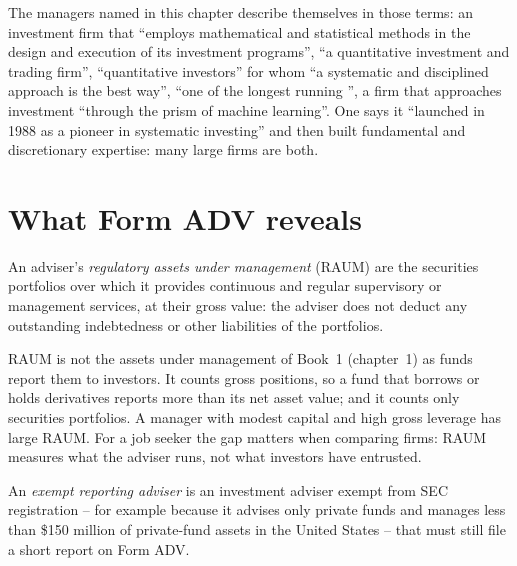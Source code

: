 The managers named in this chapter describe themselves in those terms: an investment firm that ``employs mathematical
and statistical methods in the design and execution of its investment programs'', ``a quantitative investment and trading
firm'', ``quantitative investors'' for whom ``a systematic and disciplined approach is the best way'', ``one of the
longest running '', a firm that approaches investment ``through the prism of machine learning''.
One says it ``launched in 1988 as a pioneer in systematic investing'' and then built fundamental and discretionary
expertise: many large firms are both.

\section{What Form ADV reveals}

\begin{definition}\label{def:in:quantitative-hedge-funds-and-systematic-managers:raum}
An adviser's \emph{regulatory assets under management} (RAUM) are the securities
portfolios over which it provides continuous and regular supervisory or management services, at their gross value: the
adviser does not deduct any outstanding indebtedness or other liabilities of the portfolios.
\end{definition}

RAUM is not the assets under management of Book~1 (chapter~1) as funds report them to investors. It counts gross
positions, so a fund that borrows or holds derivatives reports more than its net asset value; and it counts only
securities portfolios. A manager with modest capital and high gross leverage has large RAUM. For a job seeker the gap
matters when comparing firms: RAUM measures what the adviser runs, not what investors have entrusted.

\begin{definition}\label{def:in:quantitative-hedge-funds-and-systematic-managers:era}
An \emph{exempt reporting adviser} is an investment adviser exempt from SEC registration --
for example because it advises only private funds and manages less than \$150 million of private-fund assets in the
United States -- that must still file a short report on Form ADV.
\end{definition}

